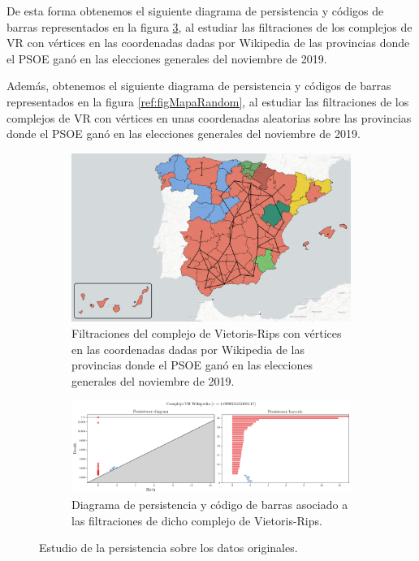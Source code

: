 De esta forma obtenemos el siguiente diagrama de persistencia y códigos de barras representados en la figura \ref{ref:figMapaWiki}, al estudiar las filtraciones de los complejos de VR con vértices en las coordenadas dadas por Wikipedia de las provincias donde el PSOE ganó en las elecciones generales del noviembre de 2019.

Además, obtenemos el siguiente diagrama de persistencia y códigos de barras representados en la figura \ref{ref:figMapaRandom}, al estudiar las filtraciones de los complejos de VR con vértices en unas coordenadas aleatorias sobre las provincias donde el PSOE ganó en las elecciones generales del noviembre de 2019.

\begin{figure}[!ht]
\centering
\begin{subfigure}[b]{\textwidth}
	\centering
	\includegraphics[width=\textwidth]{include/figuras/mapaWikipedia.png} 
	\caption{Filtraciones del complejo de Vietoris-Rips con vértices en las coordenadas dadas por Wikipedia de las provincias donde el PSOE ganó en las elecciones generales del noviembre de 2019.}
	\label{ref:mapaWiki}
\end{subfigure}
\begin{subfigure}[b]{\textwidth}
	\centering
	\includegraphics[width=\textwidth]{../code/output/ejemploMapa.png} 
	\caption{Diagrama de persistencia y código de barras asociado a las filtraciones de dicho complejo de Vietoris-Rips.}
	\label{ref:persMapaWiki}
\end{subfigure}
\caption{Estudio de la persistencia sobre los datos originales.}
\label{ref:figMapaWiki}
\end{figure} 
